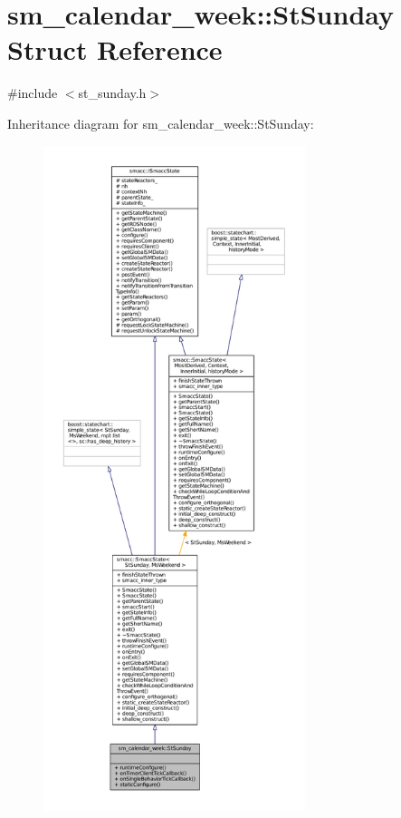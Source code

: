 \hypertarget{structsm__calendar__week_1_1StSunday}{}\section{sm\+\_\+calendar\+\_\+week\+:\+:St\+Sunday Struct Reference}
\label{structsm__calendar__week_1_1StSunday}


{\ttfamily \#include $<$st\+\_\+sunday.\+h$>$}



Inheritance diagram for sm\+\_\+calendar\+\_\+week\+:\+:St\+Sunday\+:
\nopagebreak
\begin{figure}[H]
\begin{center}
\leavevmode
\includegraphics[height=550pt]{structsm__calendar__week_1_1StSunday__inherit__graph}
\end{center}
\end{figure}


